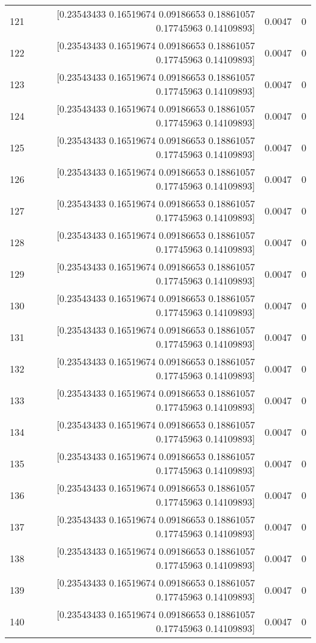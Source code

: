 \begin{longtable}{lrrr}
121 & [0.23543433 0.16519674 0.09186653 0.18861057 0.17745963 0.14109893] & 0.0047 & 0 \\
122 & [0.23543433 0.16519674 0.09186653 0.18861057 0.17745963 0.14109893] & 0.0047 & 0 \\
123 & [0.23543433 0.16519674 0.09186653 0.18861057 0.17745963 0.14109893] & 0.0047 & 0 \\
124 & [0.23543433 0.16519674 0.09186653 0.18861057 0.17745963 0.14109893] & 0.0047 & 0 \\
125 & [0.23543433 0.16519674 0.09186653 0.18861057 0.17745963 0.14109893] & 0.0047 & 0 \\
126 & [0.23543433 0.16519674 0.09186653 0.18861057 0.17745963 0.14109893] & 0.0047 & 0 \\
127 & [0.23543433 0.16519674 0.09186653 0.18861057 0.17745963 0.14109893] & 0.0047 & 0 \\
128 & [0.23543433 0.16519674 0.09186653 0.18861057 0.17745963 0.14109893] & 0.0047 & 0 \\
129 & [0.23543433 0.16519674 0.09186653 0.18861057 0.17745963 0.14109893] & 0.0047 & 0 \\
130 & [0.23543433 0.16519674 0.09186653 0.18861057 0.17745963 0.14109893] & 0.0047 & 0 \\
131 & [0.23543433 0.16519674 0.09186653 0.18861057 0.17745963 0.14109893] & 0.0047 & 0 \\
132 & [0.23543433 0.16519674 0.09186653 0.18861057 0.17745963 0.14109893] & 0.0047 & 0 \\
133 & [0.23543433 0.16519674 0.09186653 0.18861057 0.17745963 0.14109893] & 0.0047 & 0 \\
134 & [0.23543433 0.16519674 0.09186653 0.18861057 0.17745963 0.14109893] & 0.0047 & 0 \\
135 & [0.23543433 0.16519674 0.09186653 0.18861057 0.17745963 0.14109893] & 0.0047 & 0 \\
136 & [0.23543433 0.16519674 0.09186653 0.18861057 0.17745963 0.14109893] & 0.0047 & 0 \\
137 & [0.23543433 0.16519674 0.09186653 0.18861057 0.17745963 0.14109893] & 0.0047 & 0 \\
138 & [0.23543433 0.16519674 0.09186653 0.18861057 0.17745963 0.14109893] & 0.0047 & 0 \\
139 & [0.23543433 0.16519674 0.09186653 0.18861057 0.17745963 0.14109893] & 0.0047 & 0 \\
140 & [0.23543433 0.16519674 0.09186653 0.18861057 0.17745963 0.14109893] & 0.0047 & 0 \\

\end{longtable}
